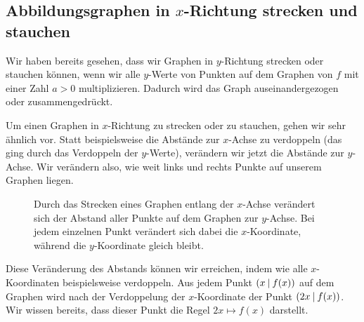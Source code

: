 \documentclass[../../main.tex]{subfiles}
\begin{document}
\subsection{Abbildungsgraphen in \texorpdfstring{$x$}{x}-Richtung strecken und stauchen}
\label{sec:abbildungen_strecken_x}

Wir haben bereits gesehen, dass wir Graphen in $y$-Richtung strecken oder stauchen können, wenn wir alle $y$-Werte von Punkten auf dem Graphen von $f$ mit einer Zahl $a>0$ multiplizieren. Dadurch wird das Graph auseinandergezogen oder zusammengedrückt.

Um einen Graphen in $x$-Richtung zu strecken oder zu stauchen, gehen wir sehr ähnlich vor. Statt beispielsweise die Abstände zur $x$-Achse zu verdoppeln (das ging durch das Verdoppeln der $y$-Werte), verändern wir jetzt die Abstände zur $y$-Achse. Wir verändern also, wie weit links und rechts Punkte auf unserem Graphen liegen.

\begin{figure}[ht]
    \centering
        \caption{Durch das Strecken eines Graphen entlang der $x$-Achse verändert sich der Abstand aller Punkte auf dem Graphen zur $y$-Achse. Bei jedem einzelnen Punkt verändert sich dabei die $x$-Koordinate, während die $y$-Koordinate gleich bleibt.}
\end{figure}

Diese Veränderung des Abstands können wir erreichen, indem wie alle $x$-Koordinaten beispielsweise verdoppeln. Aus jedem Punkt $\left(x \:\middle|\: f(x)\right)$ auf dem Graphen wird nach der Verdoppelung der $x$-Koordinate der Punkt $\left(2x \:\middle|\: f(x)\right)$. Wir wissen bereits, dass dieser Punkt die Regel $2x\mapsto f(x)$ darstellt.
\end{document}

